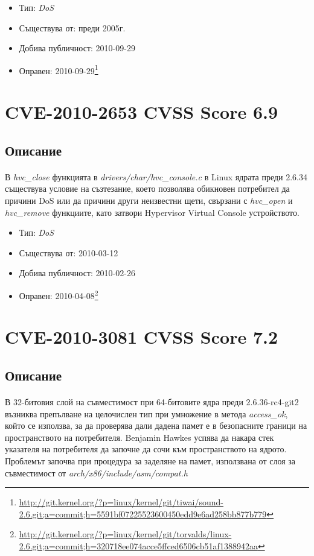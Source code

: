 \documentclass[a4paper,12pt,leqno]{article}
\begin{document}
\begin{itemize}
    \item Тип: \textit{DoS}
    \item Съществува от: преди 2005г.
  	\item Добива публичност: 2010-09-29
    \item Оправен: 2010-09-29\footnote{\url{http://git.kernel.org/?p=linux/kernel/git/tiwai/sound-2.6.git;a=commit;h=5591bf07225523600450edd9e6ad258bb877b779}}
\end{itemize}

\section{CVE-2010-2653 CVSS Score 6.9}
\subsection{Описание}
\paragraph{}
В \textit{hvc\_close} функцията в \textit{drivers/char/hvc\_console.c} в Linux ядрата преди 2.6.34 съществува условие на съзтезание, което позволява обикновен потребител да причини DoS или да причини други неизвестни щети, свързани с \textit{hvc\_open} и \textit{hvc\_remove} функциите, като затвори Hypervisor Virtual Console устройството.

\begin{itemize}
    \item Тип: \textit{DoS}
    \item Съществува от: 2010-03-12
  	\item Добива публичност: 2010-02-26
    \item Оправен: 2010-04-08\footnote{\url{http://git.kernel.org/?p=linux/kernel/git/torvalds/linux-2.6.git;a=commit;h=320718ee074acce5ffced6506cb51af1388942aa}}
\end{itemize}

\section{CVE-2010-3081 CVSS Score 7.2}
\subsection{Описание}
\paragraph{}
В 32-битовия слой на съвместимост при 64-битовите ядра преди 2.6.36-rc4-git2 възниква препълване на целочислен тип при умножение в метода \textit{access\_ok}, който се използва, за да проверява дали дадена памет е в безопасните граници на пространството на потребителя. Benjamin Hawkes успява да накара стек указателя на потребителя да започне да сочи към пространството на ядрото. Проблемът започва при процедура за заделяне на памет, използвана от слоя за съвместимост от \textit{arch/x86/include/asm/compat.h}
\end{document}
